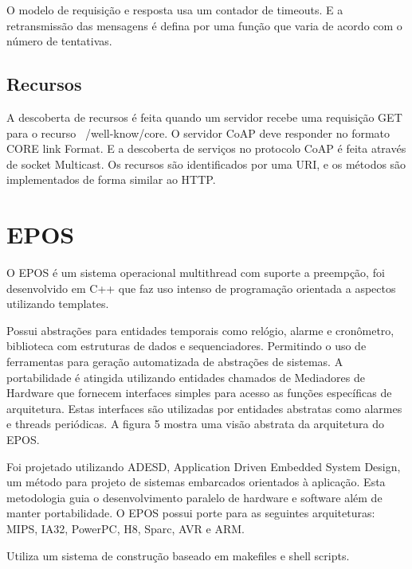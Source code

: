 O modelo de requisi\c{c}\~ao e resposta usa um contador de timeouts. E a retransmiss\~ao das mensagens \'e defina por uma fun\c{c}\~ao que varia de acordo com o n\'umero de tentativas.
 

\subsection{Recursos}
A descoberta de recursos \'e feita quando um servidor recebe uma requisi\c{c}\~ao GET para o recurso ~/well-know/core. O servidor CoAP deve responder no formato CORE link Format.\cite{rfc6690} E a descoberta de servi\c{c}os no protocolo CoAP \'e feita atrav\'es de socket Multicast. Os recursos s\~ao identificados por uma URI, e os m\'etodos s\~ao implementados de forma similar ao HTTP.



\section{EPOS}
O EPOS \'e um sistema operacional multithread com suporte a preemp\c{c}\~ao, foi desenvolvido em C++ que faz uso intenso de programa\c{c}\~ao orientada a aspectos utilizando templates.

Possui abstra\c{c}\~oes para entidades temporais como rel\'ogio, alarme e cron\^ometro, biblioteca com estruturas de dados e sequenciadores. Permitindo o uso de ferramentas para gera\c{c}\~ao automatizada de abstra\c{c}\~oes de sistemas. A portabilidade \'e atingida utilizando entidades chamados de Mediadores de Hardware que fornecem interfaces simples para acesso as fun\c{c}\~oes espec\'ificas de arquitetura. Estas interfaces s\~ao utilizadas por entidades abstratas como alarmes e threads peri\'odicas. A figura 5 mostra uma vis\~ao abstrata da arquitetura do EPOS.


Foi projetado utilizando ADESD, Application Driven Embedded System Design, um m\'etodo para projeto de sistemas embarcados orientados \`a aplica\c{c}\~ao. Esta metodologia guia o desenvolvimento paralelo de hardware e software al\'em de manter portabilidade. O EPOS possui porte para as seguintes arquiteturas: MIPS, IA32, PowerPC, H8, Sparc, AVR e ARM. \cite{epos}

Utiliza um sistema de constru\c{c}\~ao baseado em makefiles e shell scripts.


